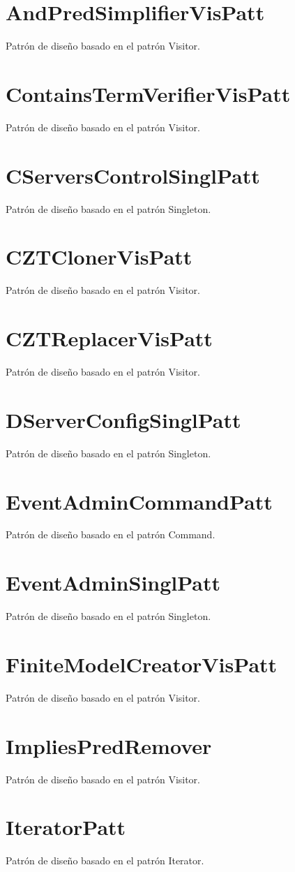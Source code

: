\documentclass[a4paper,10pt]{report}
\begin{document}
	\section{AndPredSimplifierVisPatt}
	Patrón de diseño basado en el patrón Visitor.
	\section{ContainsTermVerifierVisPatt}
	Patrón de diseño basado en el patrón Visitor.
	\section{CServersControlSinglPatt}
	Patrón de diseño basado en el patrón Singleton.
	\section{CZTClonerVisPatt}
	Patrón de diseño basado en el patrón Visitor.
	\section{CZTReplacerVisPatt}
	Patrón de diseño basado en el patrón Visitor.
	\section{DServerConfigSinglPatt}
	Patrón de diseño basado en el patrón Singleton.
	\section{EventAdminCommandPatt}
	Patrón de diseño basado en el patrón Command.
	\section{EventAdminSinglPatt}
	Patrón de diseño basado en el patrón Singleton.
	\section{FiniteModelCreatorVisPatt}
	Patrón de diseño basado en el patrón Visitor.
	\section{ImpliesPredRemover}
	Patrón de diseño basado en el patrón Visitor.
	\section{IteratorPatt}
	Patrón de diseño basado en el patrón Iterator.
\end{document}
